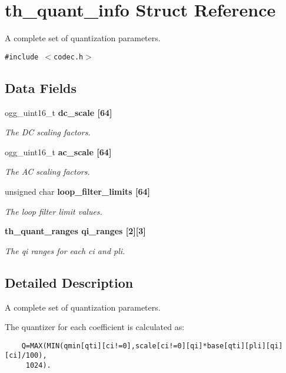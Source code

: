 \section{th\_\-quant\_\-info Struct Reference}
\label{structth__quant__info}
A complete set of quantization parameters.  


{\tt \#include $<$codec.h$>$}

\subsection*{Data Fields}
\begin{CompactItemize}
\item 
ogg\_\-uint16\_\-t \bf{dc\_\-scale} [64]
\begin{CompactList}\small\item\em The DC scaling factors. \item\end{CompactList}\item 
ogg\_\-uint16\_\-t \bf{ac\_\-scale} [64]
\begin{CompactList}\small\item\em The AC scaling factors. \item\end{CompactList}\item 
unsigned char \bf{loop\_\-filter\_\-limits} [64]
\begin{CompactList}\small\item\em The loop filter limit values. \item\end{CompactList}\item 
\bf{th\_\-quant\_\-ranges} \bf{qi\_\-ranges} [2][3]
\begin{CompactList}\small\item\em The {\em qi\/} ranges for each {\em ci\/} and {\em pli\/}. \item\end{CompactList}\end{CompactItemize}


\subsection{Detailed Description}
A complete set of quantization parameters. 

The quantizer for each coefficient is calculated as: 

\begin{Code}\begin{verbatim}    Q=MAX(MIN(qmin[qti][ci!=0],scale[ci!=0][qi]*base[qti][pli][qi][ci]/100),
     1024).
\end{verbatim}\end{Code}



